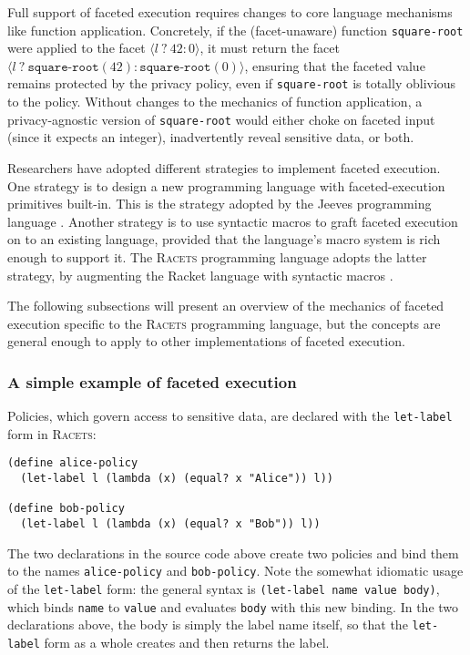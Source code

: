 \documentclass{article}
\begin{document}
Full support of faceted execution requires changes to core language mechanisms like function application. Concretely, if the (facet-unaware) function \texttt{square-root} were applied to the facet $\langle l \ ?\ 42 : 0 \rangle$, it must return the facet $\langle l \ ?\ \texttt{square-root}(42) : \texttt{square-root}(0) \rangle$, ensuring that the faceted value remains protected by the privacy policy, even if \texttt{square-root} is totally oblivious to the policy. Without changes to the mechanics of function application, a privacy-agnostic version of \texttt{square-root} would either choke on faceted input (since it expects an integer), inadvertently reveal sensitive data, or both.

Researchers have adopted different strategies to implement faceted execution. One strategy is to design a new programming language with faceted-execution primitives built-in. This is the strategy adopted by the Jeeves programming language \cite{jeeves}. Another strategy is to use syntactic macros to graft faceted execution on to an existing language, provided that the language's macro system is rich enough to support it. The \textsc{Racets} programming language adopts the latter strategy, by augmenting the Racket language with syntactic macros \cite{racets}.

The following subsections will present an overview of the mechanics of faceted execution specific to the \textsc{Racets} programming language, but the concepts are general enough to apply to other implementations of faceted execution.


\subsubsection{A simple example of faceted execution}
Policies, which govern access to sensitive data, are declared with the \texttt{let-label} form in \textsc{Racets}:

\begin{lstlisting}
(define alice-policy
  (let-label l (lambda (x) (equal? x "Alice")) l))

(define bob-policy
  (let-label l (lambda (x) (equal? x "Bob")) l))
\end{lstlisting}

The two declarations in the source code above create two policies and bind them to the names \texttt{alice-policy} and \texttt{bob-policy}. Note the somewhat idiomatic usage of the \texttt{let-label} form: the general syntax is \texttt{(let-label name value body)}, which binds \texttt{name} to \texttt{value} and evaluates \texttt{body} with this new binding. In the two declarations above, the body is simply the label name itself, so that the \texttt{let-label} form as a whole creates and then returns the label.
\end{document}
